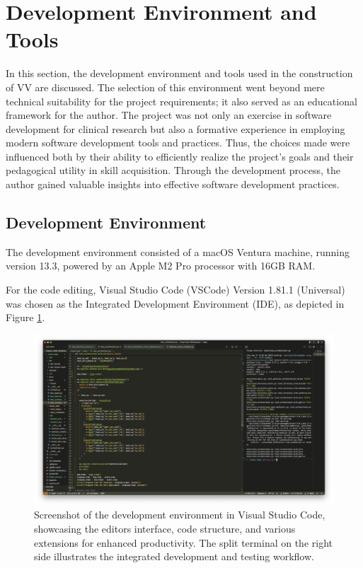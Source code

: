 \section{Development Environment and
Tools}\label{development-environment-and-tools}

In this section, the development environment and tools used in the
construction of VV are discussed. The selection of this environment went
beyond mere technical suitability for the project requirements; it also
served as an educational framework for the author. The project was not
only an exercise in software development for clinical research but also
a formative experience in employing modern software development tools
and practices. Thus, the choices made were influenced both by their
ability to efficiently realize the project's goals and their pedagogical
utility in skill acquisition. Through the development process, the
author gained valuable insights into effective software development
practices.

\subsection{Development Environment}\label{development-environment}

The development environment consisted of a macOS Ventura machine,
running version 13.3, powered by an Apple M2 Pro processor with 16GB
RAM.

For the code editing, Visual Studio Code (VSCode) Version 1.81.1
(Universal) was chosen as the Integrated Development Environment (IDE),
as depicted in Figure \ref{fig:vsc}.

\begin{figure}[ht]
  \centering
  \includegraphics[width=\textwidth]{media/fig2.png}
  \caption{Screenshot of the development environment in Visual Studio
  Code, showcasing the editor\textquotesingle s interface, code structure,
  and various extensions for enhanced productivity. The split terminal on
  the right side illustrates the integrated development and testing
  workflow.}
  \label{fig:vsc}
\end{figure}

